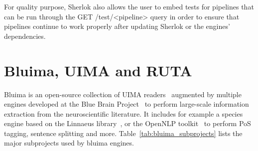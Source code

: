 \documentclass{article}
\newcommand{\REST}[1]{\textsf{#1}}
\begin{document}
For quality purpose, Sherlok also allows the user to embed tests for pipelines that can be run
through the \REST{GET /test/<pipeline>} query in order to ensure that pipelines continue to work
properly after updating Sherlok or the engines' dependencies.

\section{Bluima, UIMA and RUTA}
\label{sec:bluima}

Bluima is an open-source collection of UIMA readers~\cite{uima} augmented by multiple engines
developed at the Blue Brain Project~\cite{bbp} to perform large-scale information extraction from
the neuroscientific literature. It includes for example a species engine based on the Linnaeus
library~\cite{linnaeus_2010}, or the OpenNLP toolkit~\cite{opennlp} to perform PoS tagging, sentence
splitting and more. Table~\ref{tab:bluima_subprojects} lists the major subprojects used by bluima
engines.
\end{document}
